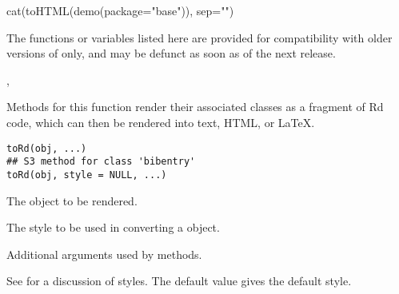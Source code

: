 %
\begin{SeeAlso}\relax
{}
\end{SeeAlso}
%
\begin{Examples}
\begin{ExampleCode}
cat(toHTML(demo(package="base")), sep="\n")
\end{ExampleCode}
\end{Examples}
%
\begin{Description}\relax
The functions or variables listed here are provided for compatibility
with older versions of \R{} only, and may be defunct as soon as of the
next release.
\end{Description}
%
\begin{SeeAlso}\relax
{},
\end{SeeAlso}
%
\begin{Description}\relax
Methods for this function render their associated classes as a fragment of Rd
code, which can then be rendered into text, HTML, or LaTeX.
\end{Description}
%
\begin{Usage}
\begin{verbatim}
toRd(obj, ...)
## S3 method for class 'bibentry'
toRd(obj, style = NULL, ...)
\end{verbatim}
\end{Usage}
%
\begin{Arguments}
\begin{ldescription}
\item[\code{obj}] 
The object to be rendered.

\item[\code{style}] 
The style to be used in converting a  object.  

\item[\code{...}] 
Additional arguments used by methods.

\end{ldescription}
\end{Arguments}
%
\begin{Details}\relax
See  for a discussion of styles.  The default  value
gives the default style.
\end{Details}
